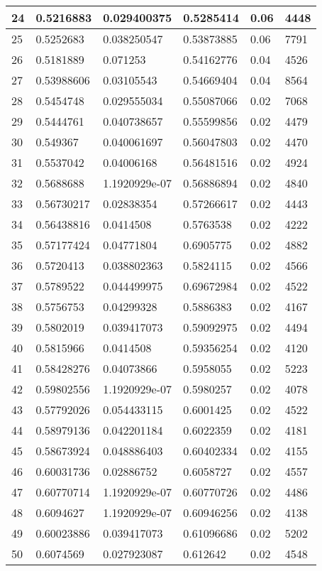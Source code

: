 \begin{longtable}{|l|l|l|l|l|l|}
24 & 0.5216883 & 0.029400375 & 0.5285414 & 0.06 & 4448 \\ \hline 
25 & 0.5252683 & 0.038250547 & 0.53873885 & 0.06 & 7791 \\ \hline 
26 & 0.5181889 & 0.071253 & 0.54162776 & 0.04 & 4526 \\ \hline 
27 & 0.53988606 & 0.03105543 & 0.54669404 & 0.04 & 8564 \\ \hline 
28 & 0.5454748 & 0.029555034 & 0.55087066 & 0.02 & 7068 \\ \hline 
29 & 0.5444761 & 0.040738657 & 0.55599856 & 0.02 & 4479 \\ \hline 
30 & 0.549367 & 0.040061697 & 0.56047803 & 0.02 & 4470 \\ \hline 
31 & 0.5537042 & 0.04006168 & 0.56481516 & 0.02 & 4924 \\ \hline 
32 & 0.5688688 & 1.1920929e-07 & 0.56886894 & 0.02 & 4840 \\ \hline 
33 & 0.56730217 & 0.02838354 & 0.57266617 & 0.02 & 4443 \\ \hline 
34 & 0.56438816 & 0.0414508 & 0.5763538 & 0.02 & 4222 \\ \hline 
35 & 0.57177424 & 0.04771804 & 0.6905775 & 0.02 & 4882 \\ \hline 
36 & 0.5720413 & 0.038802363 & 0.5824115 & 0.02 & 4566 \\ \hline 
37 & 0.5789522 & 0.044499975 & 0.69672984 & 0.02 & 4522 \\ \hline 
38 & 0.5756753 & 0.04299328 & 0.5886383 & 0.02 & 4167 \\ \hline 
39 & 0.5802019 & 0.039417073 & 0.59092975 & 0.02 & 4494 \\ \hline 
40 & 0.5815966 & 0.0414508 & 0.59356254 & 0.02 & 4120 \\ \hline 
41 & 0.58428276 & 0.04073866 & 0.5958055 & 0.02 & 5223 \\ \hline 
42 & 0.59802556 & 1.1920929e-07 & 0.5980257 & 0.02 & 4078 \\ \hline 
43 & 0.57792026 & 0.054433115 & 0.6001425 & 0.02 & 4522 \\ \hline 
44 & 0.58979136 & 0.042201184 & 0.6022359 & 0.02 & 4181 \\ \hline 
45 & 0.58673924 & 0.048886403 & 0.60402334 & 0.02 & 4155 \\ \hline 
46 & 0.60031736 & 0.02886752 & 0.6058727 & 0.02 & 4557 \\ \hline 
47 & 0.60770714 & 1.1920929e-07 & 0.60770726 & 0.02 & 4486 \\ \hline 
48 & 0.6094627 & 1.1920929e-07 & 0.60946256 & 0.02 & 4138 \\ \hline 
49 & 0.60023886 & 0.039417073 & 0.61096686 & 0.02 & 5202 \\ \hline 
50 & 0.6074569 & 0.027923087 & 0.612642 & 0.02 & 4548 \\ \hline 
\end{longtable}